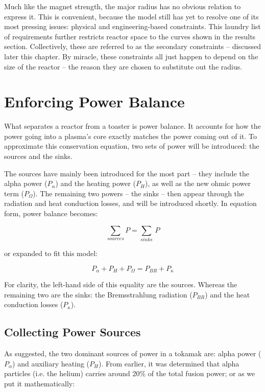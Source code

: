 Much like the magnet strength, the major radius has no obvious relation to express it. This is convenient, because the model still has yet to resolve one of its most pressing issues: physical and engineering-based constraints. This laundry list of requirements further restricts reactor space to the curves shown in the results section. Collectively, these are referred to as the secondary constraints -- discussed later this chapter. By miracle, these constraints all just happen to depend on the size of the reactor -- the reason they are chosen to substitute out the radius. 

\section{Enforcing Power Balance}

What separates a reactor from a toaster is power balance. It accounts for how the power going into a plasma's core exactly matches the power coming out of it. To approximate this conservation equation, two sets of power will be introduced: the sources and the sinks. 

The sources have mainly been introduced for the most part -- they include the alpha power ($P_\alpha$) and the heating power ($P_H$), as well as the new ohmic power term ($P_\Omega$). The remaining two powers -- the sinks -- then appear through the radiation and heat conduction losses, and will be introduced shortly. In equation form, power balance becomes:

\begin{equation}
	\sum_{sources} P = \sum_{sinks} \, P
\end{equation}

or expanded to fit this model:

\begin{equation}
	\label{eq:power_balance}
	P_\alpha + P_H + P_\Omega = P_{BR} + P_\kappa
\end{equation}

For clarity, the left-hand side of this equality are the sources. Whereas the remaining two are the sinks: the Bremsstrahlung radiation ($P_{BR}$) and the heat conduction losses ($P_\kappa$).

\subsection{Collecting Power Sources}

As suggested, the two dominant sources of power in a tokamak are: alpha power ($P_\alpha$) and auxiliary heating ($P_H$). From earlier, it was determined that alpha particles (i.e. the helium) carries around 20\% of the total fusion power; or as we put it mathematically:

